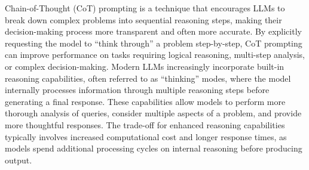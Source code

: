 Chain-of-Thought (CoT) prompting is a technique that encourages LLMs to break down complex problems into sequential reasoning steps, making their decision-making process more transparent and often more accurate.
By explicitly requesting the model to ``think through'' a problem step-by-step, CoT prompting can improve performance on tasks requiring logical reasoning, multi-step analysis, or complex decision-making.
Modern LLMs increasingly incorporate built-in reasoning capabilities, often referred to as ``thinking'' modes, where the model internally processes information through multiple reasoning steps before generating a final response.
These capabilities allow models to perform more thorough analysis of queries, consider multiple aspects of a problem, and provide more thoughtful responses.
The trade-off for enhanced reasoning capabilities typically involves increased computational cost and longer response times, as models spend additional processing cycles on internal reasoning before producing output.
